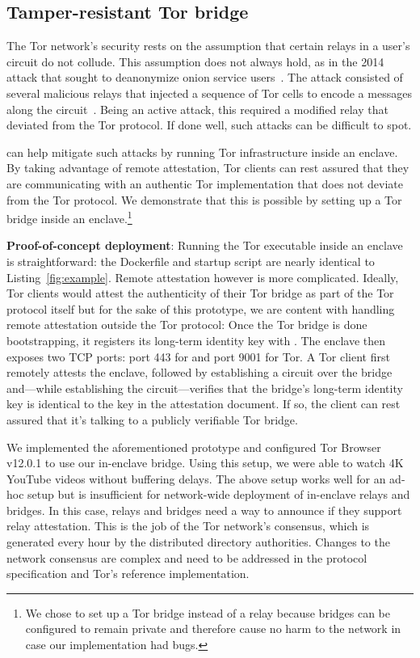 \subsection{Tamper-resistant Tor bridge}
\label{sec:tor-bridge}

The Tor network's security rests on the assumption that certain relays in a
user's circuit do not collude.  This assumption does not always hold, as in the
2014 attack that sought to deanonymize onion service
users~\cite{Dingledine2015a}.  The attack consisted of several malicious relays
that injected a sequence of Tor cells to encode a messages along the
circuit~\cite[\S~5.6]{tor-spec}.  Being an active attack, this required a
modified relay that deviated from the Tor protocol.  If done well, such attacks
can be difficult to spot.

\Tool{} can help mitigate such attacks by running Tor infrastructure inside an
enclave.  By taking advantage of remote attestation, Tor clients can rest
assured that they are communicating with an authentic Tor implementation that
does not deviate from the Tor protocol.  We demonstrate that this is possible
by setting up a Tor bridge inside an enclave.\footnote{We chose to set up a Tor
bridge instead of a relay because bridges can be configured to remain private
and therefore cause no harm to the network in case our implementation had
bugs.}

\textbf{Proof-of-concept deployment}: Running the Tor executable inside an
enclave is straightforward: the Dockerfile and startup script are nearly
identical to Listing~\ref{fig:example}.  Remote attestation however is more
complicated.  Ideally, Tor clients would attest the authenticity of their Tor
bridge as part of the Tor protocol itself but for the sake of this prototype, we
are content with handling remote attestation outside the Tor protocol: Once the
Tor bridge is done bootstrapping, it registers its long-term identity key with
\tool{}.  The enclave then exposes two TCP ports: port 443 for \tool{} and port
9001 for Tor.  A Tor client first remotely attests the enclave, followed by
establishing a circuit over the bridge and---while establishing the
circuit---verifies that the bridge's long-term identity key is identical to the
key in the attestation document.  If so, the client can rest assured that it's
talking to a publicly verifiable Tor bridge.

We implemented the aforementioned prototype and configured Tor Browser v12.0.1
to use our in-enclave bridge.  Using this setup, we were able to watch 4K
YouTube videos without buffering delays.
%
The above setup works well for an ad-hoc setup but is insufficient for
network-wide deployment of in-enclave relays and bridges.  In this case, relays
and bridges need a way to announce if they support relay attestation.  This is
the job of the Tor network's consensus, which is generated every hour by the
distributed directory authorities.  Changes to the network consensus are
complex and need to be addressed in the protocol specification and Tor's
reference implementation.

